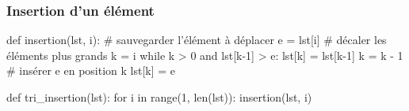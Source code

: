 \documentclass[12pt]{linfo-beamer}
\begin{document}

\begin{frame}[fragile]
 \frametitle{Insertion d'un élément}

\begin{pyframe}{}
def insertion(lst, i):
    # sauvegarder l'élément à déplacer
    e = lst[i]
    # décaler les éléments plus grands
    k = i
    while k > 0 and lst[k-1] > e:
        lst[k] = lst[k-1]
        k = k - 1
    # insérer e en position k
    lst[k] = e
\end{pyframe}



\begin{pyframe}{}
def tri_insertion(lst):
    for i in range(1, len(lst)):
        insertion(lst, i)
\end{pyframe}
\end{frame}
\end{document}
